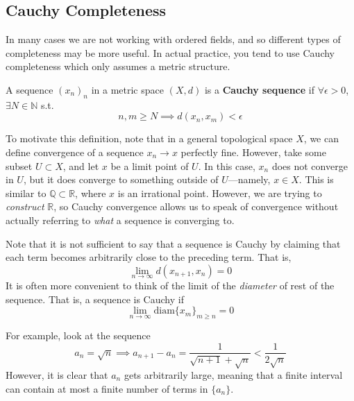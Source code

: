 \subsection{Cauchy Completeness} 

  In many cases we are not working with ordered fields, and so different types of completeness may be more useful. In actual practice, you tend to use Cauchy completeness which only assumes a metric structure. 

  \begin{definition}
    A sequence $(x_n)_n$ in a metric space $(X, d)$ is a \textbf{Cauchy sequence} if $\forall \epsilon > 0$, $\exists N \in \mathbb{N}$ s.t.  
    \begin{equation}
      n, m \geq N \implies d(x_n, x_m) < \epsilon
    \end{equation}
  \end{definition}

  To motivate this definition, note that in a general topological space $X$, we can define convergence of a sequence $x_n \to x$ perfectly fine. However, take some subset $U \subset X$, and let $x$ be a limit point of $U$. In this case, $x_n$ does not converge in $U$, but it does converge to something outside of $U$---namely, $x \in X$. This is similar to $\mathbb{Q} \subset \mathbb{R}$, where $x$ is an irrational point. However, we are trying to \textit{construct} $\mathbb{R}$, so Cauchy convergence allows us to speak of convergence without actually referring to \textit{what} a sequence is converging to. 

  Note that it is not sufficient to say that a sequence is Cauchy by claiming that each term becomes arbitrarily close to the preceding term. That is, 
  \begin{equation}
    \lim_{n \rightarrow \infty} d(x_{n+1}, x_{n}) = 0
  \end{equation}
  It is often more convenient to think of the limit of the \textit{diameter} of rest of the sequence. That is, a sequence is Cauchy if 
  \begin{equation}
    \lim_{n \rightarrow \infty} \mathrm{diam}\{x_{m}\}_{m \geq n} = 0
  \end{equation}

  \begin{example}
    For example, look at the sequence 
    \begin{equation}
      a_n = \sqrt{n} \implies a_{n+1} - a_{n} = \frac{1}{\sqrt{n+1} + \sqrt{n}} < \frac{1}{2\sqrt{n}}
    \end{equation}
    However, it is clear that $a_n$ gets arbitrarily large, meaning that a finite interval can contain at most a finite number of terms in $\{a_n\}$. 
  \end{example}

